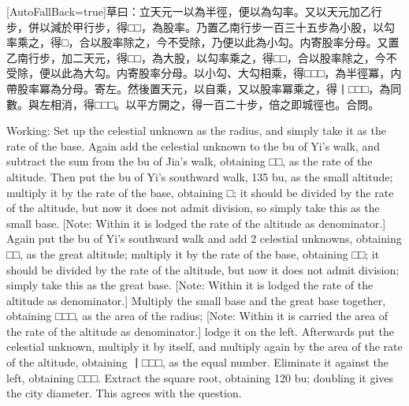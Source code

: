 \documentclass[11pt]{article}
\newcommand{\zhsmall}{\footnotesize\color{black!70}}
\newcommand{\unitlabel}[1]{\marginpar{\raggedleft\tiny\color{gray}#1}}
\newenvironment{unitzh}{\par\CJKfontspec{Noto Serif CJK SC}[AutoFallBack=true]\large\linespread{1.25}\selectfont}{\par}
\newenvironment{uniten}{\par\small\color{black!85}}{\par\medskip}
\begin{document}
\begin{unitzh}\unitlabel{ceyuan-009.5}草曰：立天元一以為半徑，便以為勾率。又以天元加乙行步，併以減於甲行步，得□□，為股率。乃置乙南行步一百三十五步為小股，以勾率乘之，得□，合以股率除之，今不受除，乃便以此為小勾。{\zhsmall 内寄股率分母。}又置乙南行步，加二天元，得□□，為大股，以勾率乘之，得□□，合以股率除之，今不受除，便以此為大勾。{\zhsmall 内寄股率分母。}以小勾、大勾相乘，得□□□，為半徑冪，{\zhsmall 内帶股率冪為分母。}寄左。然後置天元，以自乘，又以股率冪乘之，得丨□□□，為同數。與左相消，得□□□。以平方開之，得一百二十步，倍之即城徑也。合問。\end{unitzh}
\begin{uniten}Working: Set up the celestial unknown as the radius, and simply take it as the rate of the base. Again add the celestial unknown to the bu of Yi's walk, and subtract the sum from the bu of Jia's walk, obtaining □□, as the rate of the altitude. Then put the bu of Yi's southward walk, 135 bu, as the small altitude; multiply it by the rate of the base, obtaining □; it should be divided by the rate of the altitude, but now it does not admit division, so simply take this as the small base. [Note: Within it is lodged the rate of the altitude as denominator.] Again put the bu of Yi's southward walk and add 2 celestial unknowns, obtaining □□, as the great altitude; multiply it by the rate of the base, obtaining □□; it should be divided by the rate of the altitude, but now it does not admit division; simply take this as the great base. [Note: Within it is lodged the rate of the altitude as denominator.] Multiply the small base and the great base together, obtaining □□□, as the area of the radius; [Note: Within it is carried the area of the rate of the altitude as denominator.] lodge it on the left. Afterwards put the celestial unknown, multiply it by itself, and multiply again by the area of the rate of the altitude, obtaining 丨□□□, as the equal number. Eliminate it against the left, obtaining □□□. Extract the square root, obtaining 120 bu; doubling it gives the city diameter. This agrees with the question.\end{uniten}
\end{document}
